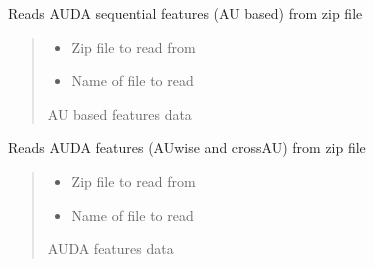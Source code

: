 \documentclass[letterpaper,10pt,english]{sphinxmanual}
\begin{document}
\begin{fulllineitems}
\label{\detokenize{dataset:dataset.read_au_txt}}
\pysigstartsignatures
{}
\pysigstopsignatures
\sphinxAtStartPar
Reads AUDA sequential features (AU based) from zip file
\begin{quote}\begin{description}
\begin{itemize}
\item {} 
\sphinxAtStartPar
{} \textendash{} Zip file to read from

\item {} 
\sphinxAtStartPar
{} \textendash{} Name of file to read

\end{itemize}

\sphinxAtStartPar
AU based features data

\end{description}\end{quote}

\end{fulllineitems}


\begin{fulllineitems}
\label{\detokenize{dataset:dataset.read_auwise_txt}}
\pysigstartsignatures
{}
\pysigstopsignatures
\sphinxAtStartPar
Reads AUDA features (AU\sphinxhyphen{}wise and cross\sphinxhyphen{}AU) from zip file
\begin{quote}\begin{description}
\begin{itemize}
\item {} 
\sphinxAtStartPar
{} \textendash{} Zip file to read from

\item {} 
\sphinxAtStartPar
{} \textendash{} Name of file to read

\end{itemize}

\sphinxAtStartPar
AUDA features data

\end{description}\end{quote}

\end{fulllineitems}
\end{document}
